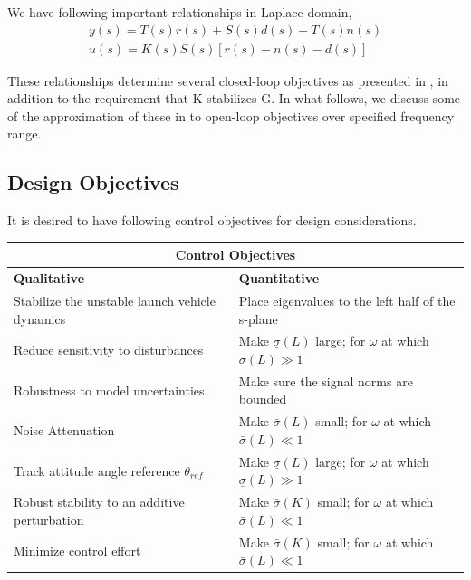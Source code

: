 \documentclass[12pt]{article}
\begin{document}
	\noindent We have following important relationships \cite{cite3} in Laplace domain,
	\begin{equation}
	\begin{split}
	y(s) = T(s)r(s) + S(s)d(s) - T(s)n(s)\\
	u(s) = K(s)S(s)[ r(s) - n(s) - d(s)]
	\end{split}
	\end{equation}
	
	\noindent These relationships determine several closed-loop objectives as presented in \cite{cite3}, in addition to the requirement that K stabilizes G.  In what follows, we discuss some of the approximation of these in to open-loop objectives over specified frequency range.
	
	\subsection{Design Objectives}
	\noindent It is desired to have following control objectives for design considerations. 
	\begin{center}
		\noindent \begin{tabular}{ |p{8.5cm}|p{8.5cm}| }
			\hline
			\multicolumn{2}{|c|}{\textbf{Control Objectives}} \\
			\hline
			\textbf{Qualitative} & \textbf{Quantitative} \\
			\hline
			Stabilize the unstable launch vehicle dynamics & Place eigenvalues to the left half of the s-plane\\ 
			\hline
			Reduce sensitivity to disturbances & Make $\underline{\sigma}(L)$ large; for $\omega$ at which $\underline{\sigma}(L) \gg 1$\\
			\hline
			Robustness to model uncertainties & Make sure the signal norms are bounded\\
			\hline
			Noise Attenuation & Make $\bar{\sigma}(L)$ small; for $\omega$ at which $\bar{\sigma}(L) \ll 1$ \\
			\hline
			Track attitude angle reference $\theta_{ref}$ & Make $\underline{\sigma}(L)$ large; for $\omega$ at which $\underline{\sigma}(L) \gg 1$\\
			\hline
			Robust stability to an additive perturbation & Make $\bar{\sigma}(K)$ small; for $\omega$ at which $\bar{\sigma}(L) \ll 1$ \\
			\hline
			Minimize control effort & Make $\bar{\sigma}(K)$ small; for $\omega$ at which $\bar{\sigma}(L) \ll 1$ \\ \hline
		\end{tabular}
	\end{center}
	
\end{document}
